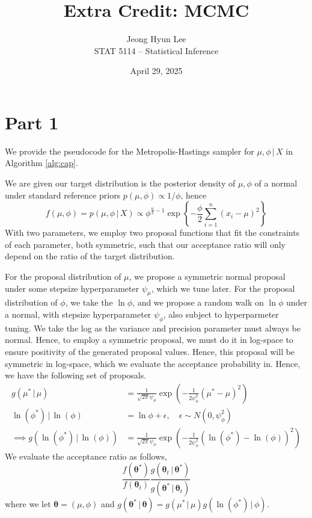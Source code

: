\documentclass[12pt]{article}
\begin{document}
\title{Extra Credit: MCMC}
\author{Jeong Hyun Lee\\
STAT 5114 -- Statistical Inference}
\date{April 29, 2025}

\maketitle

\section*{Part 1}

We provide the pseudocode for the Metropolis-Hastings sampler for \(\mu,\phi\,|\,X\) in Algorithm \ref{alg:cap}.

We are given our target distribution is the posterior density of \(\mu,\phi\) of a normal under standard reference priors \(p(\mu,\phi)\propto1/\phi\), hence
\[f(\mu,\phi)=p(\mu,\phi\,|\,X)\propto\phi^{\frac{n}{2}-1}\exp\left\{-\frac{\phi}{2}\sum_{i=1}^n(x_i-\mu)^2\right\}\]
With two parameters, we employ two proposal functions that fit the constraints of each parameter, both symmetric, such that our acceptance ratio will only depend on the ratio of the target distribution.

For the proposal distribution of \(\mu\), we propose a symmetric normal proposal under some stepsize hyperparameter \(\psi_\mu\), which we tune later. For the proposal distribution of \(\phi\), we take the \(\ln\phi\), and we propose a random walk on \(\ln\phi\) under a normal, with stepsize hyperparameter \(\psi_\phi\), also subject to hyperparmeter tuning. We take the log as the variance and precision parameter must always be normal. Hence, to employ a symmetric proposal, we must do it in log-space to ensure positivity of the generated proposal values. Hence, this proposal will be symmetric in log-space, which we evaluate the acceptance probability in. Hence, we have the following set of proposals.
\begin{align*}
    g(\mu^\ast\,|\,\mu)&=\frac{1}{\sqrt{2\pi}\psi_\mu}\exp\left(-\frac{1}{2\psi_\phi^2}(\mu^\ast-\mu)^2\right)\\
    \ln(\phi^\ast)\,|\,\ln(\phi)&=\ln\phi+\epsilon,\quad\epsilon\sim N(0,\psi_\phi^2)\\
    \implies g(\ln(\phi^\ast)\,|\,\ln(\phi))&=\frac{1}{\sqrt{2\pi}\psi_\phi}\exp\left(-\frac{1}{2\psi_\phi^2}(\ln(\phi^\ast)-\ln(\phi))^2\right)
\end{align*}
We evaluate the acceptance ratio as follows,
\[\frac{f(\bm\theta^\ast)}{f(\bm\theta_t)}\frac{g(\bm\theta_t\,|\,\bm\theta^\ast)}{g(\bm\theta^\ast\,|\,\bm\theta_t)}\]
where we let \(\bm\theta=(\mu,\phi)\) and \(g(\bm\theta^\ast\,|\,\bm\theta)=g(\mu^\ast\,|\,\mu)g(\ln(\phi^\ast)\,|\,\phi)\).
\end{document}

